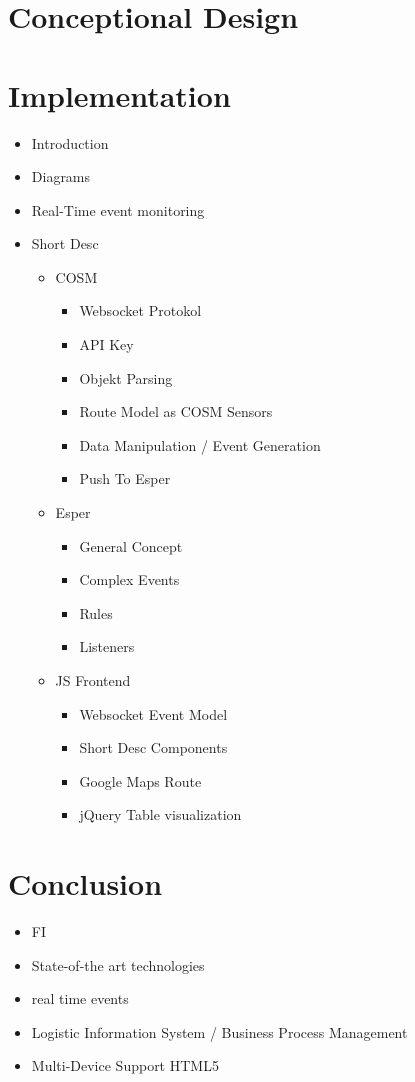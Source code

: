 \documentclass{acm_proc_article-sp}
\begin{document}
\section{Conceptional Design}
\label{sec:Conceptional Design}

\section{Implementation}
\label{sec:Implementation}

\begin{itemize}
	\item Introduction
	\item Diagrams
	\item Real-Time event monitoring
	\item Short Desc
	\begin{itemize}
		\item COSM
		\begin{itemize}
			\item Websocket Protokol
			\item API Key
			\item Objekt Parsing
			\item Route Model as COSM Sensors
			\item Data Manipulation / Event Generation
			\item Push To Esper
		\end{itemize}
		\item Esper
		\begin{itemize}
			\item General Concept
			\item Complex Events
			\item Rules
			\item Listeners
		\end{itemize}
		\item JS Frontend
		\begin{itemize}
			\item Websocket Event Model
			\item Short Desc Components
			\item Google Maps Route
			\item jQuery Table visualization
		\end{itemize}
	\end{itemize}
\end{itemize}


\section{Conclusion}
\label{sec:Conclusion}
\begin{itemize}
	\item FI
	\item State-of-the art technologies
	\item real time events
	\item Logistic Information System / Business Process Management
	\item Multi-Device Support HTML5
\end{itemize}
\end{document}
